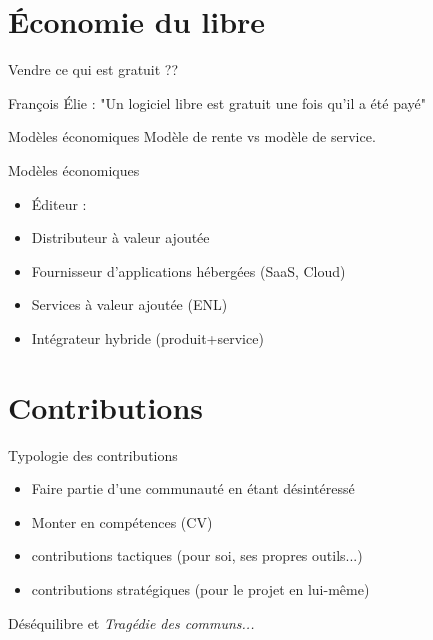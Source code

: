 \documentclass{beamer}
\begin{document}

\section{Économie du libre}

\begin{frame}{Vendre ce qui est gratuit ??}
  \begin{block}{François Élie :}
 "Un logiciel libre est gratuit une fois qu'il a été payé"
\end{block}

\begin{alertblock}{Modèles économiques}
  Modèle de rente vs modèle de service.
\end{alertblock}
\end{frame}

\begin{frame}{Modèles économiques}
  \begin{itemize}
  \item Éditeur : 
  \item Distributeur à valeur ajoutée  
  \item Fournisseur d'applications hébergées (SaaS, Cloud)  
  \item Services à valeur ajoutée (ENL)  
  \item Intégrateur hybride (produit+service)  
  \end{itemize}
  
\end{frame}

\section{Contributions}

\begin{frame}{Typologie des contributions}

  \begin{itemize}
  \item Faire partie d'une communauté en étant désintéressé
  \item Monter en compétences (CV)
  \item contributions tactiques (pour soi, ses propres outils...)
  \item contributions stratégiques (pour le projet en lui-même)
  \end{itemize}

  Déséquilibre et \textit{Tragédie des communs...}

  
\end{frame}
\end{document}
